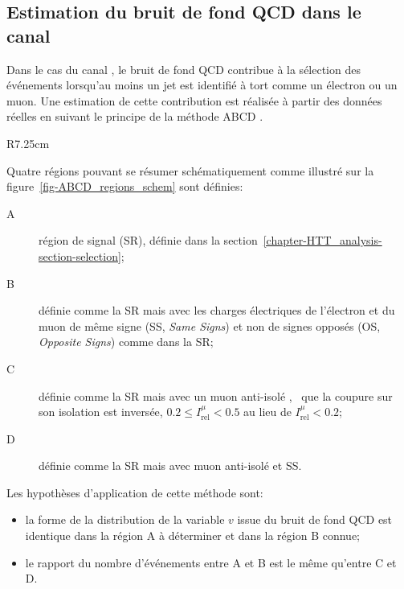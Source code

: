 \subsection{Estimation du bruit de fond QCD dans le canal \ele\mu}\label{chapter-HTT_analysis-section-bg_estimation-QCD-SS}
Dans le cas du canal \ele\mu, le bruit de fond QCD contribue à la sélection des événements lorsqu'au moins un jet est identifié à tort comme un électron ou un muon.
Une estimation de cette contribution est réalisée à partir des données réelles en suivant le principe de la méthode \og ABCD \fg.
\begin{wrapfigure}{R}{7.25cm}
\centering
{}
\caption[Régions A, B, C et D utilisées pour estimer le bruit de fond QCD.]{Définition schématique des régions A, B, C et D pour l'estimation du bruit de fond QCD.}
\label{fig-ABCD_regions_schem}
\end{wrapfigure}
\par
Quatre régions pouvant se résumer schématiquement comme illustré sur la figure~\ref{fig-ABCD_regions_schem} sont définies:
\begin{description}
\item[A] région de signal (SR), définie dans la section~\ref{chapter-HTT_analysis-section-selection};
\item[B] définie comme la SR mais avec les charges électriques de l'électron et du muon de même signe (SS, \emph{Same Signs}) et non de signes opposés (OS, \emph{Opposite Signs}) comme dans la SR;
\item[C] définie comme la SR mais avec un muon \og anti-isolé \fg{}, \ie\ que la coupure sur son isolation est inversée, $\num{0.2}\leq I_\text{rel}^{\mu} < \num{0.5}$ au lieu de $I_\text{rel}^{\mu} < \num{0.2}$;
\item[D] définie comme la SR mais avec muon anti-isolé et SS.
\end{description}
Les hypothèses d'application de cette méthode sont:
\begin{itemize}
\item la forme de la distribution de la variable $v$ issue du bruit de fond QCD est identique dans la région A à déterminer et dans la région B connue;
\item le rapport du nombre d'événements entre A et B est le même qu'entre C et D.
\end{itemize}
